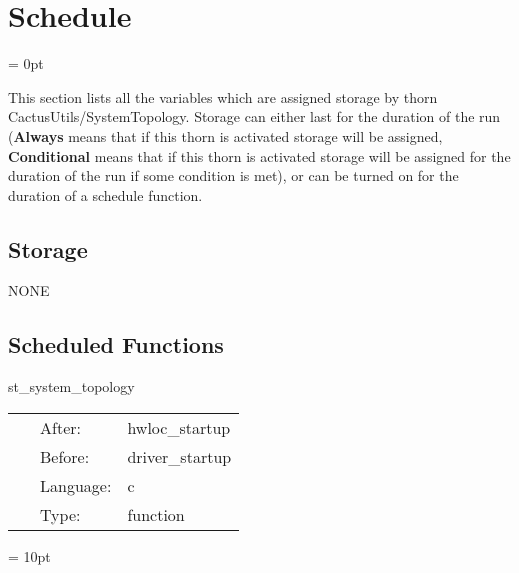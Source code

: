 
\section{Schedule} 


\parskip = 0pt


\noindent This section lists all the variables which are assigned storage by thorn CactusUtils/SystemTopology.  Storage can either last for the duration of the run ({\bf Always} means that if this thorn is activated storage will be assigned, {\bf Conditional} means that if this thorn is activated storage will be assigned for the duration of the run if some condition is met), or can be turned on for the duration of a schedule function.


\subsection*{Storage}NONE
\subsection*{Scheduled Functions}
\vspace{5mm}


\hspace{5mm} st\_system\_topology 

\hspace{5mm}{\it output and/or modify system topology and hardware locality } 


\hspace{5mm}

 \begin{tabular*}{160mm}{cll} 
~ & After:  & hwloc\_startup \\ 
~ & Before:  & driver\_startup \\ 
~ & Language:  & c \\ 
~ & Type:  & function \\ 
\end{tabular*} 



\vspace{5mm}\parskip = 10pt 
